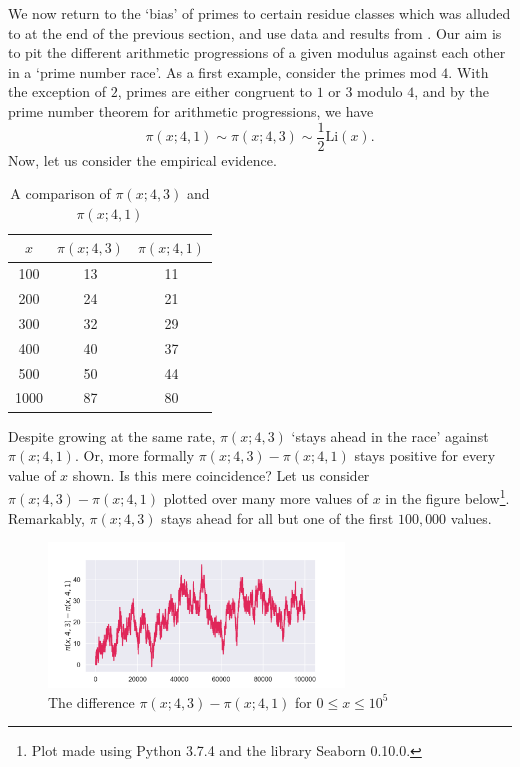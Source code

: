 We now return to the `bias' of primes to certain residue classes which was alluded to at the end of the previous section, and use data and results from \cite{granville2004prime}. Our aim is to pit the different arithmetic progressions of a given modulus against each other in a `prime number race'. As a first example, consider the primes mod $4$. With the exception of $2$, primes are either congruent to $1$ or $3$ modulo $4$, and by the prime number theorem for arithmetic progressions, we have
\begin{equation}
    \pi(x; 4, 1) \sim \pi(x; 4, 3) \sim \frac12 \textrm{Li}(x). \nonumber
\end{equation}
Now, let us consider the empirical evidence.
\begin{table}[H]
    \centering
    \begin{tabular}{|c|c|c|}
        \hline
        $x$ & $\pi(x; 4, 3)$ & $\pi(x; 4, 1)$ \\
        \hline
        100 & 13 & 11 \\
        200 & 24 & 21 \\
        300 & 32 & 29 \\
        400 & 40 & 37 \\
        500 & 50 & 44 \\
        1000 & 87 & 80 \\
        \hline
    \end{tabular}
    \caption{A comparison of $\pi(x; 4, 3)$ and $\pi(x; 4, 1)$}
\end{table}
Despite growing at the same rate, $\pi(x; 4, 3)$ `stays ahead in the race' against $\pi(x; 4, 1)$. Or, more formally $\pi(x; 4, 3) - \pi(x; 4, 1)$ stays positive for every value of $x$ shown. Is this mere coincidence? Let us consider $\pi(x; 4, 3) - \pi(x; 4, 1)$ plotted over many more values of $x$ in the figure below\footnote{Plot made using Python 3.7.4 and the library Seaborn 0.10.0.}. Remarkably, $\pi(x; 4, 3)$ stays ahead for all but one of the first $100,000$ values. 
\begin{figure}[H]
    \centering
    \includegraphics[width=0.7\textwidth]{Chapter5/prime_race_4.png}
    \caption{The difference $\pi(x; 4, 3) - \pi(x; 4, 1)$ for $0 \leq x \leq 10^{5}$}
\end{figure}
